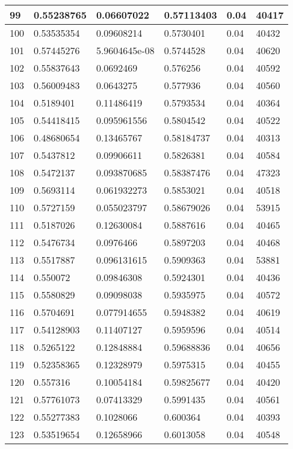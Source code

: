 \begin{longtable}{|l|l|l|l|l|l|}
99 & 0.55238765 & 0.06607022 & 0.57113403 & 0.04 & 40417 \\ \hline 
100 & 0.53535354 & 0.09608214 & 0.5730401 & 0.04 & 40432 \\ \hline 
101 & 0.57445276 & 5.9604645e-08 & 0.5744528 & 0.04 & 40620 \\ \hline 
102 & 0.55837643 & 0.0692469 & 0.576256 & 0.04 & 40592 \\ \hline 
103 & 0.56009483 & 0.0643275 & 0.577936 & 0.04 & 40560 \\ \hline 
104 & 0.5189401 & 0.11486419 & 0.5793534 & 0.04 & 40364 \\ \hline 
105 & 0.54418415 & 0.095961556 & 0.5804542 & 0.04 & 40522 \\ \hline 
106 & 0.48680654 & 0.13465767 & 0.58184737 & 0.04 & 40313 \\ \hline 
107 & 0.5437812 & 0.09906611 & 0.5826381 & 0.04 & 40584 \\ \hline 
108 & 0.5472137 & 0.093870685 & 0.58387476 & 0.04 & 47323 \\ \hline 
109 & 0.5693114 & 0.061932273 & 0.5853021 & 0.04 & 40518 \\ \hline 
110 & 0.5727159 & 0.055023797 & 0.58679026 & 0.04 & 53915 \\ \hline 
111 & 0.5187026 & 0.12630084 & 0.5887616 & 0.04 & 40465 \\ \hline 
112 & 0.5476734 & 0.0976466 & 0.5897203 & 0.04 & 40468 \\ \hline 
113 & 0.5517887 & 0.096131615 & 0.5909363 & 0.04 & 53881 \\ \hline 
114 & 0.550072 & 0.09846308 & 0.5924301 & 0.04 & 40436 \\ \hline 
115 & 0.5580829 & 0.09098038 & 0.5935975 & 0.04 & 40572 \\ \hline 
116 & 0.5704691 & 0.077914655 & 0.5948382 & 0.04 & 40619 \\ \hline 
117 & 0.54128903 & 0.11407127 & 0.5959596 & 0.04 & 40514 \\ \hline 
118 & 0.5265122 & 0.12848884 & 0.59688836 & 0.04 & 40656 \\ \hline 
119 & 0.52358365 & 0.12328979 & 0.5975315 & 0.04 & 40455 \\ \hline 
120 & 0.557316 & 0.10054184 & 0.59825677 & 0.04 & 40420 \\ \hline 
121 & 0.57761073 & 0.07413329 & 0.5991435 & 0.04 & 40561 \\ \hline 
122 & 0.55277383 & 0.1028066 & 0.600364 & 0.04 & 40393 \\ \hline 
123 & 0.53519654 & 0.12658966 & 0.6013058 & 0.04 & 40548 \\ \hline 

\end{longtable}

